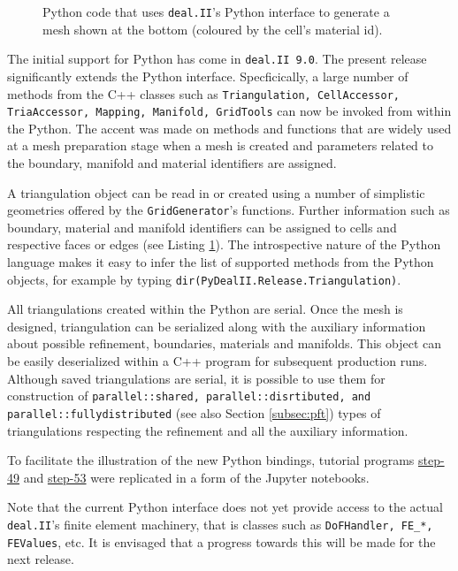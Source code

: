 \documentclass{ansarticle-preprint}
\begin{document}
\begin{figure}
\caption{Python code that uses \texttt{deal.II}'s Python interface to generate a mesh shown at the bottom (coloured by the cell's material id).}
\label{python_wrapper}
\end{figure}


The initial support for Python has come in \texttt{deal.II 9.0}. The present release significantly extends the Python interface. Specficically, a large number of methods from the C++ classes such as \texttt{Triangulation, CellAccessor, TriaAccessor, Mapping, Manifold, GridTools} can now be invoked from within the Python. The accent was made on methods and functions that are widely used at a mesh preparation stage when a mesh is created and parameters related to the boundary, manifold and material identifiers are assigned. 

A triangulation object can be read in or created using a number of simplistic geometries offered by the \texttt{GridGenerator}'s functions. Further information such as boundary, material and manifold identifiers can be assigned to cells and respective faces or edges (see Listing \ref{python_wrapper}). The introspective nature of the Python language makes it easy to infer the list of supported methods from the Python objects, for example by typing \texttt{dir(PyDealII.Release.Triangulation)}.

All triangulations created within the Python are serial. Once the mesh is designed, triangulation can be serialized along with the auxiliary information about possible refinement, boundaries, materials and manifolds. This object can be easily deserialized within a C++ program for subsequent production runs. Although saved triangulations are serial, it is possible to use them for construction of \texttt{parallel::shared, parallel::disrtibuted, and parallel::fullydistributed} (see also Section \ref{subsec:pft}) types of triangulations respecting the refinement and all the auxiliary information. 

To facilitate the illustration of the new Python bindings, tutorial programs \href{https://github.com/dealii/dealii/blob/dealii-9.2/examples/step-49/step-49.ipynb}{step-49} and \href{https://github.com/dealii/dealii/blob/dealii-9.2/examples/step-53/step-53.ipynb}{step-53} were replicated in a form of the Jupyter notebooks.

Note that the current Python interface does not yet provide access to the actual \texttt{deal.II}'s finite element machinery, that is classes such as \texttt{DoFHandler, FE\_*, FEValues}, etc. It is envisaged that a progress towards this will be made for the next release. 
\end{document}
